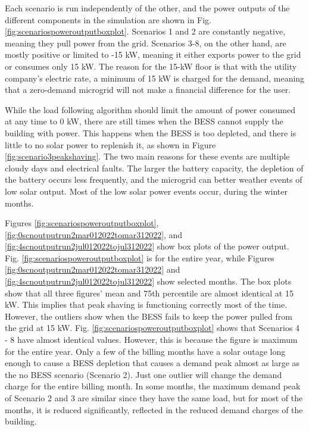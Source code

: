\documentclass[conference]{IEEEtran}
\begin{document}
		Each scenario is run independently of the other, and the power outputs of the different components in the simulation are shown in Fig. \ref{fig:scenariospoweroutputboxplot}. Scenarios 1 and 2 are constantly negative, meaning they pull power from the grid. Scenarios 3-8, on the other hand, are mostly positive or limited to -15 kW, meaning it either exports power to the grid or consumes only 15 kW. The reason for the 15-kW floor is that with the utility company's electric rate, a minimum of 15 kW is charged for the demand, meaning that a zero-demand microgrid will not make a financial difference for the user. 
		
		While the load following algorithm should limit the amount of power consumed at any time to 0 kW, there are still times when the BESS cannot supply the building with power. This happens when the BESS is too depleted, and there is little to no solar power to replenish it, as shown in Figure \ref{fig:scenario3peakshaving}. The two main reasons for these events are multiple cloudy days and electrical faults. The larger the battery capacity, the depletion of the battery occurs less frequently, and the microgrid can better weather events of low solar output. Most of the low solar power events occur, during the winter months.
		
		Figures \ref{fig:scenariospoweroutputboxplot}, \ref{fig:0scnoutputrun2mar012022tomar312022}, and \ref{fig:4scnoutputrun2jul012022tojul312022} show box plots of the power output. Fig. \ref{fig:scenariospoweroutputboxplot} is for the entire year, while Figures \ref{fig:0scnoutputrun2mar012022tomar312022} and \ref{fig:4scnoutputrun2jul012022tojul312022} show selected months. The box plots show that all three figures' mean and 75th percentile are almost identical at 15 kW. This implies that peak shaving is functioning correctly most of the time. However, the outliers show when the BESS fails to keep the power pulled from the grid at 15 kW. Fig. \ref{fig:scenariospoweroutputboxplot} shows that Scenarios 4 - 8 have almost identical values. However, this is because the figure is maximum for the entire year. Only a few of the billing months have a solar outage long enough to cause a BESS depletion that causes a demand peak almost as large as the no BESS scenario (Scenario 2). %
		Just one outlier will change the demand charge for the entire billing month. In some months, the maximum demand peak of Scenario 2 and 3 are similar since they have the same load, but for most of the months, it is reduced significantly, reflected in the reduced demand charges of the building.   %
		
\end{document}

